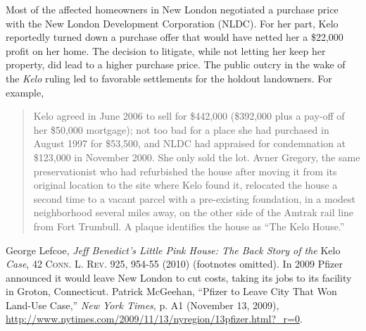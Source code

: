 \item Most of the affected homeowners in New London negotiated a purchase price
with the New London Development Corporation (NLDC). For her part, Kelo
reportedly turned down a purchase offer that would have netted her a \$22,000
profit on her home. The decision to litigate, while not letting her keep her
property, did lead to a higher purchase price. The public outcry in the wake of
the \textit{Kelo} ruling led to favorable settlements for the holdout
landowners. For example,
\begin{quote}
Kelo agreed in June 2006 to sell for \$442,000 (\$392,000 plus a pay-off of her
\$50,000 mortgage); not too bad for a place she had purchased in August 1997 for
\$53,500, and NLDC had appraised for condemnation at \$123,000 in November 2000.
She only sold the lot. Avner Gregory, the same preservationist who had
refurbished the house after moving it from its original location to the site
where Kelo found it, relocated the house a second time to a vacant parcel with a
pre-existing foundation, in a modest neighborhood several miles away, on the
other side of the Amtrak rail line from Fort Trumbull. A plaque identifies the
house as ``The Kelo House.'' 
\end{quote}
George Lefcoe, \textit{Jeff Benedict's Little Pink House: The Back Story of the}
Kelo \textit{Case}, 42 \textsc{Conn. L. Rev}. 925, 954-55 (2010) (footnotes
omitted). In 2009 Pfizer announced it would leave New London to cut costs,
taking its jobs to its facility in Groton, Connecticut. Patrick McGeehan,
``Pfizer to Leave City That Won Land-Use Case,'' \textit{New York Times}, p. A1
(November 13, 2009),
\url{http://www.nytimes.com/2009/11/13/nyregion/13pfizer.html?_r=0}. 

